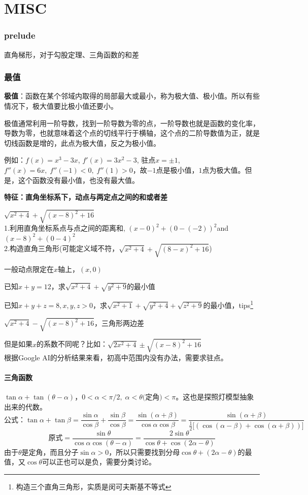 \documentclass[algebra.tex]{subfiles}
\begin{document}
\part{MISC}
\section{prelude}
直角梯形，对于勾股定理、三角函数的和差

\clearpage
\section{最值}
\textbf{极值}：函数在某个邻域内取得的局部最大或最小，称为极大值、极小值。所以有些情况下，极大值要比极小值还要小。

极值通常利用一阶导数，找到一阶导数为零的点，一阶导数也就是函数的变化率，导数为零，也就意味着这个点的切线平行于横轴，这个点的二阶导数值为正，就是切线函数是增的，此点为极大值，反之为极小值。

例如：$f(x)=x^3-3x$, $f'(x)=3x^2-3$, 驻点$x=\pm 1$, $f''(x)=6x, \;f''(-1)<0, \; f''(1)>0$，故$-1$点是极小值，$1$点为极大值。但是，这个函数没有最小值，也没有最大值。

\textbf{特征：直角坐标系下，动点与两定点之间的和或者差}

$\sqrt{x^2+4} + \sqrt{(x-8)^2+16}$\\
1.利用直角坐标系点与点之间的距离和, $(x-0)^2+(0-(-2))^2 $and $(x-8)^2+(0-4)^2$\\
2.构造直角三角形(可能定义域不符，$\sqrt{x^2+4} + \sqrt{(8-x)^2+16}$)

一般动点限定在$x$轴上，$(x, 0)$

已知$x+y=12$，求$\sqrt{x^2+4}+\sqrt{y^2+9}$的最小值

已知$x+y+z=8, x,y,z>0$，求$\sqrt{x^2+1}+\sqrt{y^2+4}+\sqrt{z^2+9}$的最小值，tips\footnote{构造三个直角三角形，实质是闵可夫斯基不等式}

$\sqrt{x^2+4} - \sqrt{(x-8)^2+16}$，三角形两边差

但是如果$x$的系数不同呢？比如：$\sqrt{2x^2+4} \pm \sqrt{(x-8)^2+16}$\\
根据Google AI的分析结果来看，初高中范围内没有办法，需要求驻点。

\subsection{三角函数}
\hrulefill

$\tan\alpha + \tan(\theta-\alpha)$，$0<\alpha <\pi/2, \;\alpha<\theta\text{(定角)}<\pi$。这也是探照灯模型抽象出来的代数。
\[
  \text{公式：} \tan\alpha+\tan\beta= \frac{\sin\alpha}{\cos\beta} + \frac{\sin\beta}{\cos\beta}=\frac{\sin(\alpha+\beta)}{\cos\alpha\cos\beta}=\frac{\sin(\alpha+\beta)}{\frac{1}{2}\bigl[(\cos(\alpha-\beta)+\cos(\alpha+\beta))\bigr]}
\]
\[
  \text{原式}=\displaystyle \frac{\sin \theta}{\cos\alpha \cos(\theta-\alpha)} = \displaystyle \frac{2\sin\theta}{\cos\theta+\cos(2\alpha-\theta)}
\]
由于$\theta$是定角，而且分子$\sin\alpha>0$，所以只需要找到分母$\cos\theta+(2\alpha-\theta)$的最值，又$\cos\theta$可以正也可以是负，需要分类讨论。
\end{document}
